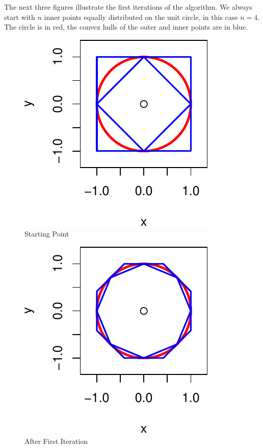 \documentclass[
  12pt,
  letterpaper,
  DIV=11,
  numbers=noendperiod]{scrreprt}
\theoremstyle{remark}
\begin{document}
The next three figures illustrate the first iterations of the algorithm.
We always start with \(n\) inner points equally distributed on the unit
circle, in this case \(n=4\). The circle is in red, the convex hulls of
the outer and inner points are in blue.

\begin{figure}[H]

{\centering \includegraphics{global_files/figure-pdf/globalcircleplotfirst-1.pdf}

}

\caption{Starting Point}

\end{figure}%

\begin{figure}[H]

{\centering \includegraphics{global_files/figure-pdf/globalcircleplotsecond-1.pdf}

}

\caption{After First Iteration}

\end{figure}%
\end{document}
